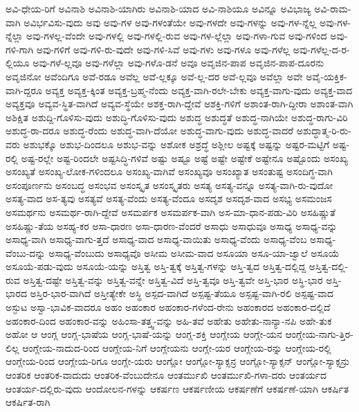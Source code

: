 {ಅವಿ-ಧೇಯ-ರಿಗೆ
ಅವಿನಾಶಿ
ಅವಿನಾಶಿ-ಯಾಗಿರು
ಅವಿನಾಶಿ-ಯಾದ
ಅವಿ-ನಾಶಿಯೂ
ಅವಿನ್ನೂ
ಅವಿಭಾಜ್ಯ
ಅವಿ-ರಾಮ-ವಾಗಿ
ಅವಿರ್ಭವಿಸು-ವುದು
ಅವು
ಅವು-ಗಳ
ಅವು-ಗಳಂತೆಯೇ
ಅವು-ಗಳದೇ
ಅವು-ಗಳನ್ನು
ಅವು-ಗಳ-ನ್ನೆಲ್ಲ
ಅವು-ಗಳ-ನ್ನೆಲ್ಲಾ
ಅವು-ಗಳಲ್ಲ-ವೆಂದೇ
ಅವು-ಗಳಲ್ಲಿ
ಅವು-ಗಳಲ್ಲಿ-ರುವ
ಅವು-ಗಳ-ಲ್ಲೆಲ್ಲಾ
ಅವು-ಗಳಾ-ಗುವ
ಅವು-ಗಳಿಂದ
ಅವು-ಗಳಿ-ಗಾಗಿ
ಅವು-ಗಳಿಗೆ
ಅವು-ಗಳಿ-ರು-ವುದೇ
ಅವು-ಗಳಿ-ಸಿವೆ
ಅವು-ಗಳು
ಅವು-ಗಳೂ
ಅವು-ಗಳೆಲ್ಲ
ಅವು-ಗಳೆಲ್ಲ-ದ-ರ-ಲ್ಲಿಯೂ
ಅವು-ಗಳೆ-ಲ್ಲವೂ
ಅವು-ಗಳೆಲ್ಲಾ
ಅವು-ಗಳೊ-ಡನೆ
ಅವೂ
ಅವೃಜಿನ-ಪಾಪ
ಅವೃಜಿನ-ಪಾಪ-ದೂರನು
ಅವೃಜಿನೋ
ಅವೆಂದಿಗೂ
ಅವೆ-ರಡೂ
ಅವೆಲ್ಲ
ಅವೆ-ಲ್ಲಕ್ಕೂ
ಅವೆ-ಲ್ಲ-ದರ
ಅವೆ-ಲ್ಲವೂ
ಅವೆಲ್ಲಾ
ಅವೇ
ಅವೈ-ಯಕ್ತಿಕ-ವಾಗಿ-ದ್ದರೂ
ಅವ್ಯಕ್ತ
ಅವ್ಯಕ್ತ-ಕ್ಕಿಂತ
ಅವ್ಯಕ್ತ-ಬ್ರಹ್ಮ-ನೆಂದು
ಅವ್ಯಕ್ತ-ವಾಗಿ-ರಲೇ-ಬೇಕು
ಅವ್ಯಕ್ತ-ವಾಗು-ವುದು
ಅವ್ಯಕ್ತ-ವಾದ
ಅವ್ಯಕ್ತವೂ
ಅವ್ಯವ-ಸ್ಥಿತ-ವಾಗಿದೆ
ಅವ್ಯವ-ಸ್ಥೆಯೇ
ಅಶಕ್ತ-ರಾಗಿ-ದ್ದೇವೆ
ಅಶಕ್ತಿ-ಗಳಿಗೆ
ಅಶಾಂತ-ರಾಗಿ-ದ್ದೀರಾ
ಅಶಾಂತ-ವಾಗಿ
ಅಶಿಕ್ಷಿತ
ಅಶುದ್ದಿ-ಗೊಳಿಸು-ವುದು
ಅಶುದ್ಧಿ-ಗೊಳಿಸು-ವುದು
ಅಶುದ್ಧ
ಅಶುದ್ಧತೆ
ಅಶುದ್ಧ-ನಾಗಿಯೇ
ಅಶುದ್ಧ-ರಾಗು-ವಿರಿ
ಅಶುದ್ಧ-ರಾ-ದರೂ
ಅಶುದ್ಧ-ರೆಂದು
ಅಶುದ್ಧ-ವಾಗಿ-ದೆಯೋ
ಅಶುದ್ಧ-ವಾಗು-ವುದು
ಅಶುದ್ಧ-ವಾದರೆ
ಅಶುದ್ಧಾತ್ಮ-ರಿ-ರು-ವರು
ಅಶುಭಕ್ಕೊ
ಅಶುಭ-ದಿಂದಲೂ
ಅಶುಭ-ವನ್ನು
ಅಶೋಕ
ಅಶ್ರದ್ಧೆ
ಅಶ್ಲೀಲ
ಅಷ್ಟಕ್ಕೆ
ಅಷ್ಟನ್ನು
ಅಷ್ಟರ-ಮಟ್ಟಿಗೆ
ಅಷ್ಟ-ರಲ್ಲಿ
ಅಷ್ಟ-ರಲ್ಲೇ
ಅಷ್ಟ-ರಿಂದಲೇ
ಅಷ್ಟಸಿದ್ಧಿ-ಗಳಿವೆ
ಅಷ್ಟು
ಅಷ್ಟೂ
ಅಷ್ಟೆ
ಅಷ್ಟೇ
ಅಷ್ಟೇಕೆ
ಅಷ್ಟೇನೂ
ಅಷ್ಟೊಂದು
ಅಸಂಖ್ಯ
ಅಸಂಖ್ಯತೆ
ಅಸಂಖ್ಯ-ಲೋಕ-ಗಳಿಂದಲೂ
ಅಸಂಖ್ಯ-ವಾಗಿವೆ
ಅಸಂಖ್ಯವೂ
ಅಸಂಖ್ಯಾತ
ಅಸಂತುಷ್ಟ
ಅಸಂದಿಗ್ಧ-ವಾಗಿ
ಅಸಂಪೂರ್ಣನು
ಅಸಂಬದ್ಧ
ಅಸಂಭವ
ಅಸಂಸ್ಕೃತ
ಅಸಂಸ್ಕೃತರು
ಅಸತ್ಯ
ಅಸತ್ಯ-ವನ್ನೂ
ಅಸತ್ಯ-ವಾಗಿ-ರು-ವುದೋ
ಅಸತ್ಯ-ವಾದ
ಅಸ-ತ್ಯವು
ಅಸತ್ಯವೆ
ಅಸತ್ಯ-ವೆಂದು
ಅಸತ್ಯ-ವೆಂದೂ
ಅಸದೃಶ
ಅಸದೃಶ-ವಾದ
ಅಸಭ್ಯ
ಅಸಮಂಜಸ
ಅಸಮರ್ಥನು
ಅಸಮರ್ಥ-ರಾಗಿ-ದ್ದೇವೆ
ಅಸಮರ್ಪಕ
ಅಸಮರ್ಪಕ-ವಾಗಿ
ಅಸ-ಮಾ-ಧಾನ-ಪಡು-ವಿರಿ
ಅಸಹಿಷ್ಣುತೆ
ಅಸಹಿಷ್ಣು-ತೆಯ
ಅಸಹ್ಯ-ಕರ
ಅಸಾ-ಧಾರಣ
ಅಸಾ-ಧಾರಣ-ವೆಂದರೆ
ಅಸಾಧು
ಅಸಾಧುವೂ
ಅಸಾಧ್ಯ
ಅಸಾಧ್ಯ-ವನ್ನು
ಅಸಾಧ್ಯ-ವಾಗಿ
ಅಸಾಧ್ಯ-ವಾಗು-ತ್ತದೆ
ಅಸಾಧ್ಯ-ವಾದ
ಅಸಾಧ್ಯ-ವಾಯಿತು
ಅಸಾಧ್ಯ-ವೆಂದು
ಅಸಾಧ್ಯ-ವೆಂಬ
ಅಸಾಧ್ಯ-ವೆಂಬು-ದನ್ನು
ಅಸಾಧ್ಯ-ವೆಂಬುದು
ಅಸಾಧ್ಯವೊ
ಅಸೀಮ
ಅಸೀಮ-ವಾದ
ಅಸೂಯಾ
ಅಸೂ-ಯಾ-ಜ್ವಾಲೆ
ಅಸೂಯೆ
ಅಸೂಯೆ-ಪಡು-ವುದು
ಅಸೂಯೆ-ಯನ್ನು
ಅಸ್ತಿತ್ವ
ಅಸ್ತಿ-ತ್ವಕ್ಕೆ
ಅಸ್ತಿತ್ವ-ಗಳನ್ನು
ಅಸ್ತಿ-ತ್ವದ
ಅಸ್ತಿತ್ವ-ದಲ್ಲಿದ್ದ
ಅಸ್ತಿತ್ವ-ದಲ್ಲಿ-ರುವ
ಅಸ್ತಿತ್ವ-ದಷ್ಟೇ
ಅಸ್ತಿತ್ವ-ವನ್ನು
ಅಸ್ತಿತ್ವ-ವನ್ನೇ
ಅಸ್ತಿತ್ವ-ವಿದೆ
ಅಸ್ತಿ-ತ್ವವೂ
ಅಸ್ತಿ-ತ್ವವೇ
ಅಸ್ತಿ-ಭಾರ
ಅಸ್ಥಿ-ಭಾರ
ಅಸ್ತಿ-ಭಾರದ
ಅಸ್ತಿರ-ಭಾರ-ವಾಗಿದೆ
ಅಸ್ತೀತ್ಯೇಕೇ
ಅಸ್ಥಿ
ಅಸ್ಪದ-ವಾಗಿದೆ
ಅಸ್ಪಷ್ಟ-ತೆಯೂ
ಅಸ್ಪಷ್ಟ-ವಾಗಿ-ರಲಿ
ಅಸ್ಪಷ್ಟ-ವಾದ
ಅಸ್ಫುಟ
ಅಸ್ವಾ-ಭಾವಿಕ-ವಾದರೂ
ಅಹಂ
ಅಹಂಕಾರ
ಅಹಂಕಾರ-ಗಳೆಂದ-ರೇನು
ಅಹಂಕಾರದ
ಅಹಂಕಾರ-ದಲ್ಲಿದೆ
ಅಹಂಕಾರ-ದಿಂದ
ಅಹಂಕಾರ-ವನ್ನು
ಅಹಿಂಸಾ-ತತ್ತ್ವ-ವನ್ನು
ಅಹಿ-ತವೆ
ಅಹೇತು
ಅಹೇತು-ನಾನ್ಯಾ-ನಪಿ
ಅಹೇ-ತುಕ
ಅಹೋ
ಆ
ಆಂಗ್ಲ
ಆಂಗ್ಲ-ಭಾಷೆಯ
ಆಂಗ್ಲ-ಭಾಷೆ-ಯನ್ನು
ಆಂಗ್ಲ-ಶಕ್ತಿ
ಆಂಗ್ಲೇಯ
ಆಂಗ್ಲೇ-ಯನ
ಆಂಗ್ಲೇಯ-ನಾಗು-ತ್ತಿರ-ಲಿಲ್ಲ
ಆಂಗ್ಲೇಯ-ನಾದುದ-ರಿಂದ
ಆಂಗ್ಲೇಯ-ನಿಗೆ
ಆಂಗ್ಲೇಯನು
ಆಂಗ್ಲೇ-ಯರ
ಆಂಗ್ಲೇಯ-ರನ್ನು
ಆಂಗ್ಲೇಯ-ರಲ್ಲಿ
ಆಂಗ್ಲೇಯ-ರಿಂದ
ಆಂಗ್ಲೇಯ-ರಿಗೂ
ಆಂಗ್ಲೇ-ಯರು
ಆಂಗ್ಲೋ
ಆಂಗ್ಲೋ-ಸ್ಯಾಕ್ಸನ್ರ
ಆಂಗ್ಲೋ-ಸ್ಯಾಕ್ಸನ್
ಆಂಗ್ಲೋ-ಸ್ಯಾಕ್ಸನ್ರು
ಆಂತರಿಕ
ಆಂತರಿಕ-ವಾದುದು
ಆಂತರಿಕ-ವೆಂಬುದೇನೂ
ಆಂತರ್ಮುಖಿ
ಆಂತರ್ಮುಖಿ-ಗಳಾ-ದರು
ಆಂತರ್ಯದ
ಆಂತರ್ಯ-ದಲ್ಲಿರು-ವುದು
ಆಂದೋಲನ-ಗಳನ್ನು
ಆಕರ್ಷಣ
ಆಕರ್ಷಣೀಯ
ಆಕರ್ಷಣೆಗೆ
ಆಕರ್ಷಣೆ-ಯಾಗಿ
ಆಕರ್ಷಿತ
ಆಕರ್ಷಿತ-ರಾಗಿ
}
